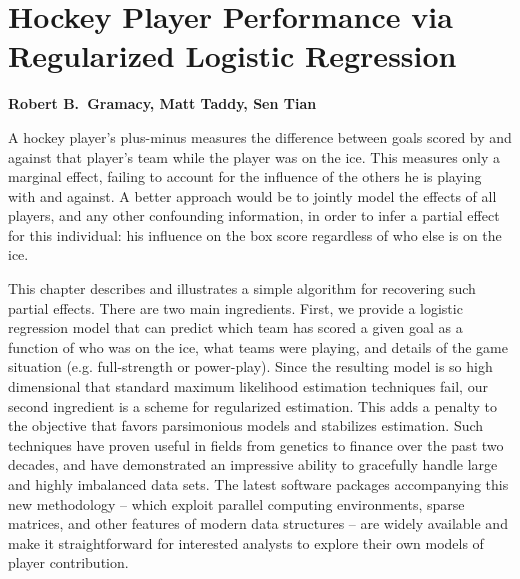 
\chapter[Hockey Performance via Regression]{Hockey Player Performance via Regularized Logistic Regression}

\noindent
{\bf Robert B.~Gramacy, Matt Taddy, Sen Tian}

\bigskip A hockey player's plus-minus measures the difference between goals
scored by and against that player's team while the player was on the ice.
This measures only a marginal effect, failing to account for the influence of
the others he is playing with and against.   A better approach would be to
jointly model the effects of all players, and any other confounding
information, in order to infer a partial effect for this individual: his
influence on the box score regardless of who else is on the ice.

This chapter describes and illustrates a  simple algorithm for recovering such
partial effects.  There are two main ingredients.  First, we provide a
logistic regression model that can predict which team has scored a given goal
as a function of who was on the ice, what teams were playing, and details of
the game situation (e.g. full-strength or power-play).  Since the resulting
model is so high dimensional that standard maximum likelihood estimation
techniques fail,  our second ingredient is a scheme for regularized
estimation.  This adds a penalty to the objective that favors parsimonious
models and stabilizes estimation.  Such techniques  have proven useful in
fields from genetics to finance over the past two decades, and have
demonstrated an impressive ability to gracefully handle large and highly
imbalanced data sets.  The latest software packages accompanying this new
methodology -- which exploit parallel computing environments, sparse matrices,
and other features of modern data structures -- are widely available and make
it straightforward for interested analysts to explore their own models of
player contribution.

